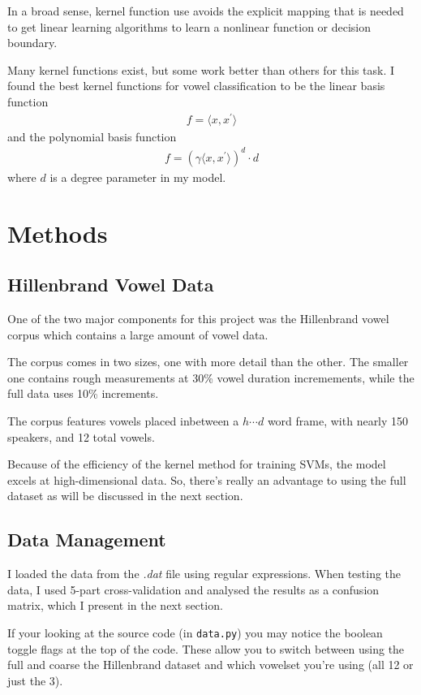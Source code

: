 \documentclass[twoside]{article}
\begin{document}
\begin{multicols}{2}
In a broad sense, kernel function use avoids the explicit mapping that is needed to get linear learning algorithms to learn a nonlinear function or decision boundary.

Many kernel functions exist, but some work better than others for this task.  I found the best kernel functions for vowel classification to be the linear basis function
\begin{align}
f=\langle x,x^\prime \rangle
\end{align}
 and the polynomial basis function
 \begin{align}
f=(\gamma \langle x,x^\prime \rangle)^d \cdot d
\end{align}
where $d$ is a degree parameter in my model.

\section{Methods}

\subsection{Hillenbrand Vowel Data}

One of the two major components for this project was the Hillenbrand vowel corpus \cite{Hillenbrand} which contains a large amount of vowel data.

The corpus comes in two sizes, one with more detail than the other.  The smaller one contains rough measurements at 30\% vowel duration incremements, while the full data uses 10\% increments.

The corpus features vowels placed inbetween a $h\cdots d$ word frame, with nearly 150 speakers, and 12 total vowels.

Because of the efficiency of the kernel method for training SVMs, the model excels at high-dimensional data.  So, there's really an advantage to using the full dataset as will be discussed in the next section.

\subsection{Data Management}

I loaded the data from the \emph{.dat} file using regular expressions.  When testing the data, I used 5-part cross-validation and analysed the results as a confusion matrix, which I present in the next section.

If your looking at the source code (in \texttt{data.py}) you may notice the boolean toggle flags at the top of the code.  These allow you to switch between using the full and coarse the Hillenbrand dataset and which vowelset you're using (all 12 or just the 3).


\end{multicols}
\end{document}
